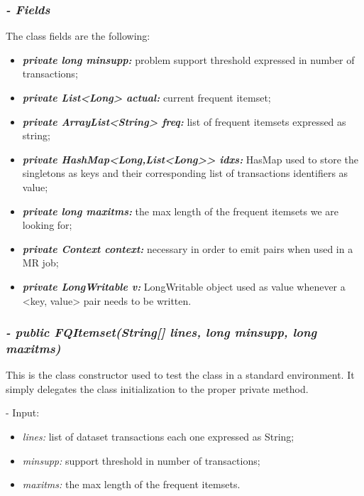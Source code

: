 \documentclass[]{report}
\begin{document}
	\subsubsection*{\textit{\textbf{-} Fields}} 
	The class fields are the following:
	\begin{itemize}
		\item \textit{\textbf{private long minsupp:}} problem support threshold expressed in number of transactions;
		\item \textit{\textbf{private List<Long> actual:}} current frequent itemset;
		\item \textit{\textbf{private ArrayList<String> freq:}} list of frequent itemsets expressed as string;
		\item \textit{\textbf{private HashMap<Long,List<Long>> idxs:}} HasMap used to store the singletons as keys and their corresponding list of transactions identifiers as value;
		\item \textit{\textbf{private long maxitms:}} the max length of the frequent itemsets we are looking for;
		\item \textit{\textbf{private Context context:}} necessary in order to emit pairs when used in a MR job; 		 
		\item \textit{\textbf{private LongWritable v:}} LongWritable object used as value whenever a <key, value> pair needs to be written.	
	\end{itemize}
	
	\subsubsection*{\textit{\textbf{-} public FQItemset(String[] lines, long minsupp, long maxitms)}}   	
	This is the class constructor used to test the class in a standard environment. It simply delegates the class initialization to the proper private method.
	   
	\begin{description}
		\item - Input:
		\begin{itemize}
			\item \textit{lines:} list of dataset transactions each one expressed as String;
			\item \textit{minsupp:} support threshold in number of transactions;
			\item \textit{maxitms:}  the max length of the frequent itemsets.
		\end{itemize}
	\end{description}
	
\end{document}
